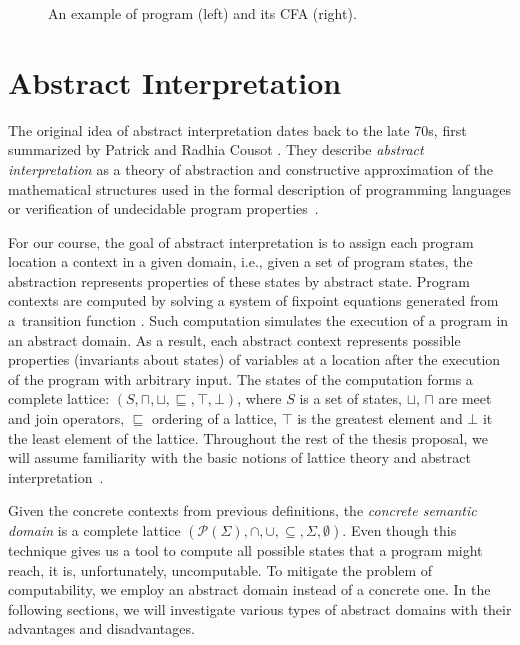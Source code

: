 \begin{figure}
\begin{minipage}[t]{0.48\textwidth}
\begin{tikzpicture}[node distance=1.1em]
\end{tikzpicture}
\end{minipage}

\caption{An example of \llvm program (left) and its CFA (right).}
\label{fig:cfa}
\end{figure}

\section{Abstract Interpretation}
\label{sec:abstraction}

The original idea of abstract interpretation dates back to the late 70s, first
summarized by Patrick and Radhia Cousot \cite{Cousot1977}.
They describe \emph{abstract interpretation} as a theory of abstraction and
constructive approximation of the mathematical structures used in the formal
description of programming languages or verification of undecidable program
properties~\cite{Cousot2012}.

For our course, the goal of abstract interpretation is to assign each program
location a context in a given domain, i.e., given a set of program states, the
abstraction represents properties of these states by abstract state. Program
contexts are computed by solving a system of fixpoint equations generated from
a~transition function \cite{Cousot1977}. Such computation simulates the
execution of a program in an abstract domain. As a result, each abstract context represents possible properties (invariants about states) of variables at a location after the execution of the program
\label{sec:symbolic}
with arbitrary input. The states of the computation forms
a complete lattice: $(S, \sqcap, \sqcup, \sqsubseteq, \top, \bot)$, where $S$
is a set of states, $\sqcup$, $\sqcap$ are meet and join operators,
$\sqsubseteq$ ordering of a lattice, $\top$ is the greatest element and $\bot$
it the least element of the lattice. Throughout the rest of the thesis proposal,
we will assume familiarity with the basic notions of lattice theory
\cite{Birkhoff1940} and abstract interpretation~\cite{Cousot1977}.

Given the concrete contexts from previous definitions, the \emph{concrete
semantic domain} is a complete lattice $(\mathcal{P}(\Sigma), \cap, \cup,
\subseteq, \Sigma, \emptyset)$. Even though this technique gives us a tool to
compute all possible states that a program might reach, it is, unfortunately,
uncomputable. To mitigate the problem of computability, we employ an abstract
domain instead of a concrete one. In the following sections, we will
investigate various types of abstract domains with their advantages and
disadvantages.

